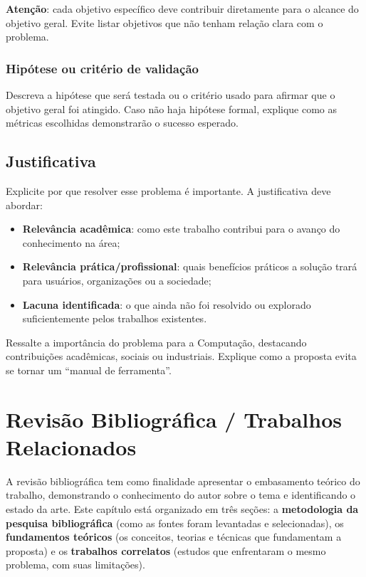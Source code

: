 \documentclass[
    12pt,                %
    openright,           %
    oneside,             %
    a4paper,             %
    english,             %
    brazil               %
]{abntex2}
\begin{document}
\textbf{Atenção}: cada objetivo específico deve contribuir diretamente para o alcance do objetivo geral. Evite listar objetivos que não tenham relação clara com o problema.

\subsection{Hipótese ou critério de validação}

Descreva a hipótese que será testada ou o critério usado para afirmar que o objetivo geral foi atingido. Caso não haja hipótese formal, explique como as métricas escolhidas demonstrarão o sucesso esperado.

\section{Justificativa}
\label{sec:justificativa}

Explicite por que resolver esse problema é importante. A justificativa deve abordar:

\begin{itemize}
    \item \textbf{Relevância acadêmica}: como este trabalho contribui para o avanço do conhecimento na área;
    \item \textbf{Relevância prática/profissional}: quais benefícios práticos a solução trará para usuários, organizações ou a sociedade;
    \item \textbf{Lacuna identificada}: o que ainda não foi resolvido ou explorado suficientemente pelos trabalhos existentes.
\end{itemize}

Ressalte a importância do problema para a Computação, destacando contribuições acadêmicas, sociais ou industriais. Explique como a proposta evita se tornar um ``manual de ferramenta''.

\chapter{Revisão Bibliográfica / Trabalhos Relacionados}
\label{cap:revisao}

A revisão bibliográfica tem como finalidade apresentar o embasamento teórico do trabalho, demonstrando o conhecimento do autor sobre o tema e identificando o estado da arte. Este capítulo está organizado em três seções: a \textbf{metodologia da pesquisa bibliográfica} (como as fontes foram levantadas e selecionadas), os \textbf{fundamentos teóricos} (os conceitos, teorias e técnicas que fundamentam a proposta) e os \textbf{trabalhos correlatos} (estudos que enfrentaram o mesmo problema, com suas limitações).
\end{document}
